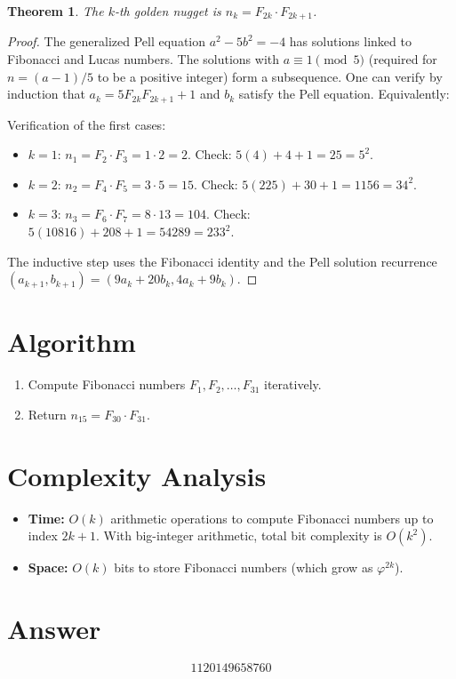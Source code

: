 \documentclass[12pt]{article}
\newtheorem{theorem}{Theorem}
\begin{document}
\begin{theorem}
The $k$-th golden nugget is $n_k = F_{2k} \cdot F_{2k+1}$.
\end{theorem}

\begin{proof}
The generalized Pell equation $a^2 - 5b^2 = -4$ has solutions linked to Fibonacci and Lucas numbers. The solutions with $a \equiv 1 \pmod{5}$ (required for $n = (a-1)/5$ to be a positive integer) form a subsequence. One can verify by induction that $a_k = 5F_{2k}F_{2k+1} + 1$ and $b_k$ satisfy the Pell equation. Equivalently:

Verification of the first cases:
\begin{itemize}
\item $k = 1$: $n_1 = F_2 \cdot F_3 = 1 \cdot 2 = 2$. Check: $5(4) + 4 + 1 = 25 = 5^2$. \checkmark
\item $k = 2$: $n_2 = F_4 \cdot F_5 = 3 \cdot 5 = 15$. Check: $5(225) + 30 + 1 = 1156 = 34^2$. \checkmark
\item $k = 3$: $n_3 = F_6 \cdot F_7 = 8 \cdot 13 = 104$. Check: $5(10816) + 208 + 1 = 54289 = 233^2$. \checkmark
\end{itemize}

The inductive step uses the Fibonacci identity and the Pell solution recurrence $(a_{k+1}, b_{k+1}) = (9a_k + 20b_k, 4a_k + 9b_k)$.
\end{proof}

\section{Algorithm}
\begin{enumerate}
    \item Compute Fibonacci numbers $F_1, F_2, \ldots, F_{31}$ iteratively.
    \item Return $n_{15} = F_{30} \cdot F_{31}$.
\end{enumerate}

\section{Complexity Analysis}
\begin{itemize}
    \item \textbf{Time:} $O(k)$ arithmetic operations to compute Fibonacci numbers up to index $2k + 1$. With big-integer arithmetic, total bit complexity is $O(k^2)$.
    \item \textbf{Space:} $O(k)$ bits to store Fibonacci numbers (which grow as $\varphi^{2k}$).
\end{itemize}

\section{Answer}

\[
\boxed{1120149658760}
\]
\end{document}
